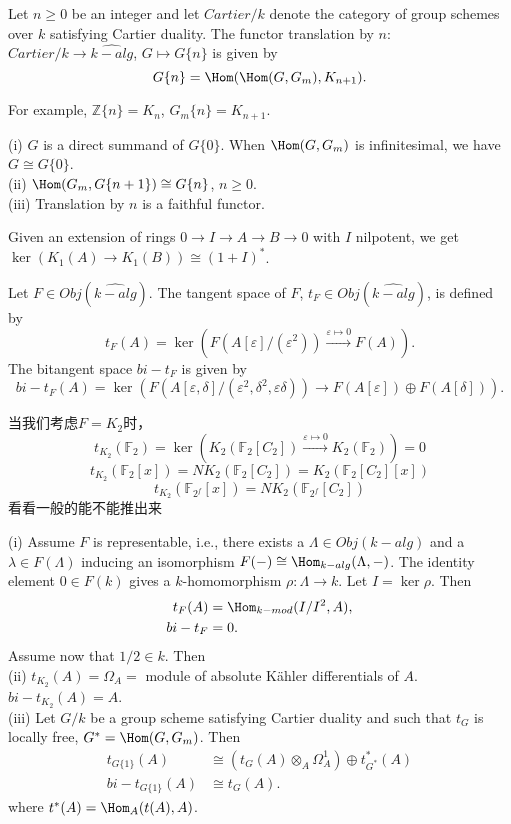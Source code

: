 \begin{definition}
	Let $n\geq 0$ be an integer and let $Cartier/k$ denote the category of group schemes over  $k$  satisfying Cartier duality. The functor translation by  $n$:  $Cartier/k \longrightarrow \widehat{k-alg}$, $G \mapsto G\{n\}$ is given by
	\[G\{n\}  =  \Hom(\Hom(G,  G_m),  K_{n+1}).\]
\end{definition}

For example, $\mathbb{Z}\{n\} = K_n$, $G_m\{n\} = K_{n+1}$.
\begin{prop}
	(i)  $G$ is a direct  summand  of $G\{0\}$.  When  $\Hom(G,  G_m)$
	is infinitesimal,  we have $G \cong G\{0\}$.\\
	(ii) $ \Hom(G_m, G\{n + 1\}) \cong  G\{n\}$,  $n \geq 0$.\\
	(iii)  Translation  by $n$ is a faithful  functor.
\end{prop}
Given  an extension  of rings  $0 \longrightarrow I \longrightarrow  A \longrightarrow B \longrightarrow 0$ with  $I$ nilpotent, we get $\ker(K_1(A)  \longrightarrow K_1(B))  \cong (1 + I)^*$.

\begin{definition}
	Let  $F \in Obj(\widehat{k-alg})$. The  tangent  space of $F$,  $t_F  \in Obj(\widehat{k-alg})$, is defined  by
\[t_F(A)  =  \ker(F(A[\varepsilon]/(\varepsilon^2)) \overset{\varepsilon\mapsto 0}\longrightarrow F(A)).\]
The  bitangent  space $bi-t_F$ is given  by
\[bi-t_F(A)  =  \ker(F(A[\varepsilon,  \delta]/(\varepsilon^2, \delta^2, \varepsilon \delta)) \longrightarrow F(A[\varepsilon]) \oplus F(A[\delta])).\]
\end{definition}

{\color{red}当我们考虑$F=K_2$时，
\[t_{K_2}(\mathbb{F}_2)=\ker(K_2(\mathbb{F}_2[C_2]) \overset{\varepsilon \mapsto 0}\longrightarrow K_2(\mathbb{F}_2))=0\]
\[t_{K_2}(\mathbb{F}_2[x])=NK_2(\mathbb{F}_2[C_2])=K_2(\mathbb{F}_2[C_2][x])\]
\[t_{K_2}(\mathbb{F}_{2^f}[x])=NK_2(\mathbb{F}_{2^f}[C_2])\]
看看一般的能不能推出来
}


\begin{prop}
	(i) Assume $F$ is representable,  i.e., there exists a $\Lambda  \in Obj(k-alg)$
	and a $\lambda \in F(\Lambda)$  inducing  an isomorphism  $F(-) \cong  \Hom_{k-alg}(\Lambda,-)$. The identity  element $0 \in F(k)$  gives a $k$-homomorphism  $\rho \colon \Lambda \longrightarrow k$. Let $I =  \ker \rho$. Then
	\begin{align*}
	t_F(A) &= \Hom_{k-mod}(I/I^2,A), \\
	bi-t_F &= 0.
	\end{align*}
	Assume now that $1/2 \in k$. Then\\
	(ii)  $t_{K_2}(A)  = \Omega_A =$ module  of  absolute  K\"{a}hler  differentials  of $A$. $bi-t_{K_2}(A)  = A$.\\
	(iii)  Let $G/k$ be a  group  scheme satisfying  Cartier  duality  and such that $t_G$ is locally free, $G^*  = \Hom(G,  G_m)$. Then
	\begin{align*}
	t_{G\{1\}}(A)& \cong (t_G(A)\otimes_A \Omega_A^1)\oplus t_{G^*}^*(A)\\
	bi-t_{G\{1\}}(A)& \cong t_G(A).
	\end{align*}
	where $t^*(A)=\Hom_A(t(A),A)$.
\end{prop}

